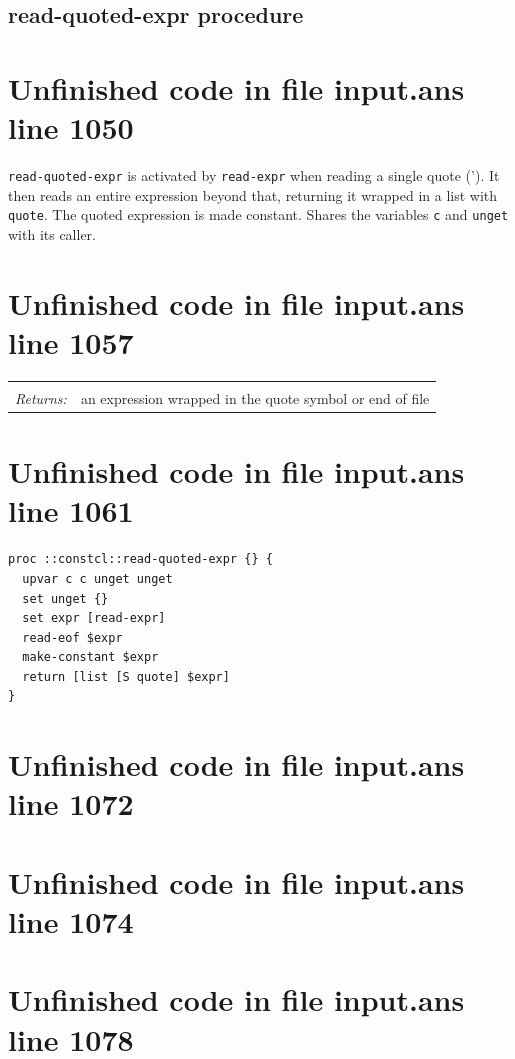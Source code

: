 \documentclass[twoside,9pt]{report}
\begin{document}
\subsection{read-quoted-expr procedure}
\label{read-quoted-expr-procedure}
\section{Unfinished code in file input.ans line 1050}


\texttt{read-quoted-expr} is activated by \texttt{read-expr} when reading a single quote ('). It then reads an entire expression beyond that, returning it wrapped in a list with \texttt{quote}. The quoted expression is made constant. Shares the variables \texttt{c} and \texttt{unget} with its caller.

\section{Unfinished code in file input.ans line 1057}
\noindent\begin{tabular}{ |p{1.9cm} p{8cm}| }
\hline
\rowcolor[HTML]{CCCCCC} \multicolumn{2}{|l|}{\bf read-quoted-expr (internal)} \\
\textit{Returns:} & an expression wrapped in the quote symbol or end of file \\
\hline
\end{tabular}
\section{Unfinished code in file input.ans line 1061}
\begin{lstlisting}
proc ::constcl::read-quoted-expr {} {
  upvar c c unget unget
  set unget {}
  set expr [read-expr]
  read-eof $expr
  make-constant $expr
  return [list [S quote] $expr]
}
\end{lstlisting}
\section{Unfinished code in file input.ans line 1072}
\section{Unfinished code in file input.ans line 1074}
\section{Unfinished code in file input.ans line 1078}
\end{document}
